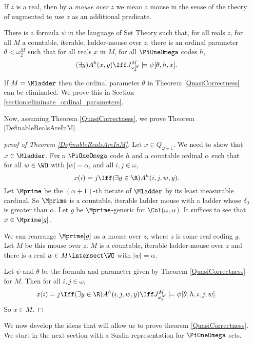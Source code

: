 \documentclass[oneside,12pt]{amsart}
\begin{document}
If $z$ is a real, then by a \emph{mouse over $z$} we mean a mouse in the
sense of the theory of \cite{FSIT} augmented to use $z$ as an additional predicate.

\begin{theorem}
\label{QuasiCorrectness}
There is a formula $\psi$ in the language of Set Theory such that, for all
reals $z$, for all $M$ a countable, iterable, ladder-mouse over $z$,
there is an ordinal parameter $\theta<\omega_2^M$ such that
for all reals $x$ in $M$,
for all $\PiOneOmega$ codes $h$,
$$(\exists y) A^h(x,y) \Iff J^M_{\omega_2^M} \models \psi[\theta, h,x].$$
\end{theorem}

\begin{remark}
If $M=\Mladder$ then the ordinal parameter $\theta$ in Theorem \ref{QuasiCorrectness} can be eliminated.
We prove this in Section \ref{section:eliminate_ordinal_parameters}.
\end{remark}

Now, assuming Theorem \ref{QuasiCorrectness}, we prove Theorem \ref{DefinableRealsAreInM}.

\begin{proof}[proof of Theorem \ref{DefinableRealsAreInM}]
Let $x\in Q_{\omega+1}$. We need to show that $x\in\Mladder$.
Fix a $\PiOneOmega$ code $h$ and a countable ordinal $\alpha$ such that for
all $w\in\WO$ with $|w|=\alpha$, and all $i,j\in\omega$,
$$x(i)=j \Iff (\exists y\in\R)A^h(i,j,w,y).$$
Let $\Mprime$ be the $(\alpha+1)$-th iterate of $\Mladder$ by its least
measurable cardinal. So $\Mprime$ is a countable, iterable ladder mouse with
a ladder whose $\delta_0$ is greater than $\alpha$. Let $g$ be $\Mprime$-generic
for $\Col(\omega,\alpha$). It suffices to see that $x\in\Mprime[g]$.

We can rearrange $\Mprime[g]$ as a mouse over $z$, where $z$ is some real coding $g$.
Let $M$ be this mouse over $z$. $M$ is a countable, iterable ladder-mouse over $z$ and there
is a real $w\in M\intersect\WO$ with $|w|=\alpha$.

Let $\psi$ and $\theta$ be the formula and parameter given by Theorem \ref{QuasiCorrectness}
for $M$. Then for all
$i,j\in\omega$,
$$x(i)=j \Iff (\exists y\in\R)A^h(i,j,w,y) \Iff J^M_{\omega_2^M} \models \psi[\theta,h,i,j,w].$$
So $x\in M$.
\end{proof}


We now develop the ideas that will allow us to prove theorem \ref{QuasiCorrectness}. We
start in the next section with a Suslin representation for $\PiOneOmega$ sets.
\end{document}
